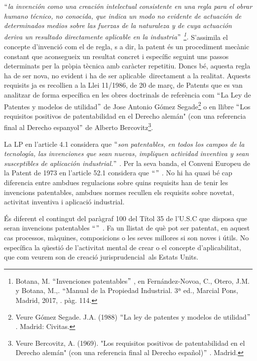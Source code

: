 \documentclass[12pt]{article}
\renewcommand{\_}{\kern-1.5pt\textunderscore\kern-1.5pt}
\begin{document}
\begin{itemize}
\vspace{\baselineskip}
\begin{justify}
$``$\textit{la invención como una creación intelectual consistente en una regla para el obrar humano técnico, no conocida, que indica un modo no evidente de actuación de determinados medios sobre las fuerzas de la naturaleza y de cuya actuación deriva un resultado directamente aplicable en la industria$"$ \footnote{Botana, M. $``$Invenciones patentables$"$ , en Fernández-Novoa, C., Otero, J.M. y Botana, M.,. $``$Manual de la Propiedad Industrial. 3ª ed., Marcial Pons, Madrid, 2017,  . pàg. 114. }. } S’assimila el concepte d’invenció com el de regla, s a dir, la patent és un procediment mecànic constant que aconsegueix un resultat concret i específic seguint uns passos determinats per la pròpia tècnica amb caràcter repetitiu. Doncs bé, aquesta regla ha de ser nova, no evident i ha de ser aplicable\ directament  a la realitat.  Aquests requisits ja es recollien a la Llei 11/1986, de 20 de març, de Patents que es van analitzar de forma específica en les obres doctrinals de referència com $``$La Ley de Patentes y modelos de utilidad$"$  de Jose Antonio Gómez Segade\footnote{ Veure Gómez Segade. J.A. (1988) $``$La ley de patentes y modelos de utilidad$"$ . Madrid: Civitas. } o en llibre $``$Los requisitos positivos de patentabilidad en el Derecho alemán" (con una referencia final al Derecho espanyol$"$  de Alberto Bercovitz\footnote{ Veure Bercovitz, A. (1969). "Los requisitos positivos de patentabilidad en el Derecho alemán" (con una referencia final al Derecho español)$"$ . Madrid.  }.
\end{justify}\par


\vspace{\baselineskip}
\begin{justify}
La LP en l’article 4.1 considera que $``$\textit{son patentables, en todos los campos de la tecnología, las invenciones que sean nuevas, impliquen actividad inventiva y sean susceptibles de aplicación industrial.$"$ }. Per la seva banda, el Conveni Europeu de la Patent de 1973 en l’article 52.1 considera que \textit{$``$$"$ . }No hi ha quasi bé cap diferencia entre ambdues regulacions sobre quins requisits han de tenir les invencions patentables, ambdues normes recullen els requisits sobre novetat, activitat inventiva i aplicació industrial. 
\end{justify}\par


\vspace{\baselineskip}
\begin{justify}
És diferent el contingut del paràgraf 100 del Títol 35 de l’U.S.C que disposa que seran invencions patentables \textit{$``$$"$ .} Fa un llistat de què pot ser patentat, en aquest cas processos, màquines, composicions o les seves millores si son noves i útils. No específica la qüestió de l’activitat mental de crear o el concepte d’aplicabilitat, que com veurem son de creació jurisprudencial\ als Estats Units.  
\end{justify}\par



\end{itemize}
\end{document}
